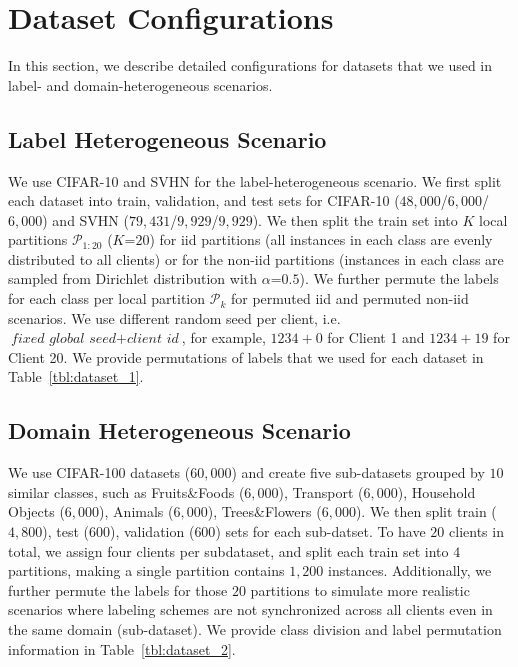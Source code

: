 \section{Dataset Configurations}
\label{appdx:dataset}
In this section, we describe detailed configurations for datasets that we used in label- and domain-heterogeneous scenarios.

\subsection{Label Heterogeneous Scenario}

We use CIFAR-10 and SVHN for the label-heterogeneous scenario. We first split each dataset into train, validation, and test sets for CIFAR-10 ($48,000$/$6,000$/$6,000$) and SVHN ($79,431$/$9,929$/$9,929$). We then split the train set into $K$ local partitions $\mathcal{P}_{1:20}$ ($K$=$20$) for iid partitions (all instances in each class are evenly distributed to all clients) or for the non-iid partitions (instances in each class are sampled from Dirichlet distribution with $\alpha$=$0.5$). We further permute the labels for each class per local partition $\mathcal{P}_k$ for permuted iid and permuted non-iid scenarios. We use different random seed per client, i.e. $\textit{fixed global seed} + \textit{client id}$, for example, $1234 + 0$ for Client 1 and $1234 + 19$ for Client 20. We provide permutations of labels that we used for each dataset in Table~\ref{tbl:dataset_1}.



\vspace{-0.3in}
\subsection{Domain Heterogeneous Scenario}

We use CIFAR-100 datasets ($60,000$) and create five sub-datasets grouped by $10$ similar classes, such as Fruits\&Foods ($6,000$), Transport ($6,000$), Household Objects ($6,000$), Animals ($6,000$), Trees\&Flowers ($6,000$). We then split train ($4,800$), test ($600$), validation ($600$) sets for each sub-datset. To have $20$ clients in total, we assign four clients per subdataset, and split each train set into $4$ partitions, making a single partition contains $1,200$ instances. Additionally, we further permute the labels for those $20$ partitions to simulate more realistic scenarios where labeling schemes are not synchronized across all clients even in the same domain (sub-dataset). We provide class division and label permutation information in Table~\ref{tbl:dataset_2}. 


